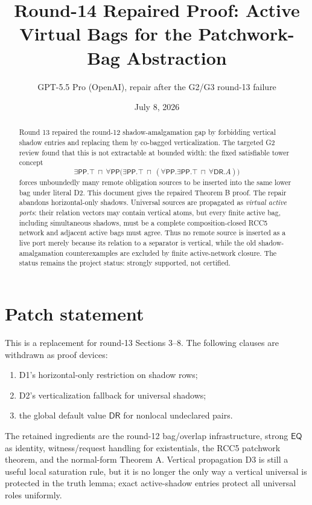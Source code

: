 \documentclass[11pt]{article}
\title{Round-14 Repaired Proof: Active Virtual Bags for the Patchwork-Bag Abstraction}
\author{GPT-5.5 Pro (OpenAI), repair after the G2/G3 round-13 failure}
\date{July 8, 2026}
\newcommand{\EQ}{\mathsf{EQ}}
\newcommand{\PP}{\mathsf{PP}}
\newcommand{\DR}{\mathsf{DR}}
\begin{document}
\maketitle

\begin{abstract}
Round 13 repaired the round-12 shadow-amalgamation gap by forbidding vertical
shadow entries and replacing them by co-bagged verticalization.  The targeted
G2 review found that this is not extractable at bounded width: the fixed
satisfiable tower concept
\[
  \exists\PP.\top\ \sqcap\
  \forall\PP\bigl(\exists\PP.\top\ \sqcap\
        (\forall\PP.\exists\PP.\top\ \sqcap\ \forall\DR.A)\bigr)
\]
forces unboundedly many remote obligation sources to be inserted into the same
lower bag under literal D2.  This document gives the repaired Theorem B proof.
The repair abandons horizontal-only shadows.  Universal sources are propagated
as \emph{virtual active ports}: their relation vectors may contain vertical
atoms, but every finite active bag, including simultaneous shadows, must be a
complete composition-closed RCC5 network and adjacent active bags must agree.
Thus no remote source is inserted as a live port merely because its relation to
a separator is vertical, while the old shadow-amalgamation counterexamples are
excluded by finite active-network closure.  The status remains the project
status: strongly supported, not certified.
\end{abstract}

\tableofcontents

\section{Patch statement}

This is a replacement for round-13 Sections 3--8.  The following clauses are
withdrawn as proof devices:
\begin{enumerate}[label=(\roman*),leftmargin=2em]
\item D1's horizontal-only restriction on shadow rows;
\item D2's verticalization fallback for universal shadows;
\item the global default value \(\DR\) for nonlocal undeclared pairs.
\end{enumerate}
The retained ingredients are the round-12 bag/overlap infrastructure, strong
\(\EQ\) as identity, witness/request handling for existentials, the RCC5
patchwork theorem, and the normal-form Theorem A.  Vertical propagation D3 is
still a useful local saturation rule, but it is no longer the only way a
vertical universal is protected in the truth lemma; exact active-shadow entries
protect all universal roles uniformly.
\end{document}
